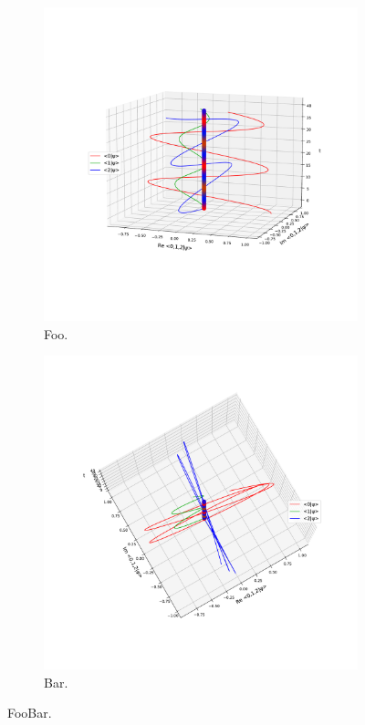 
\begin{figure}[h]
  \begin{subfigure}[b]{\textwidth}
    \centering
    \includegraphics[height=0.45\textheight,clip,trim=80 180 40 140]{img/3ldetect/hermitianSpaceTime_side.pdf}
    \caption{Foo.}
  \end{subfigure}
  \par\bigskip
  \begin{subfigure}[b]{\textwidth}
    \centering
    \includegraphics[height=0.41\textheight,clip,trim= 20 120 20 220]{img/3ldetect/hermitianSpaceTime_top.pdf}
    \caption{Bar.}
  \end{subfigure}
  \caption{FooBar.}
\end{figure}

